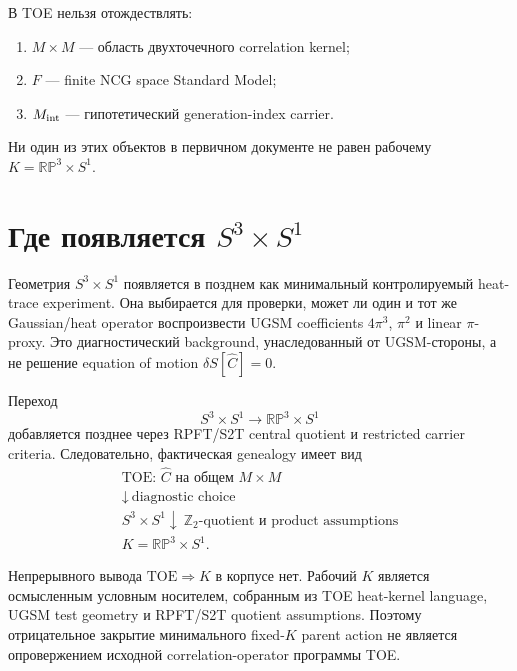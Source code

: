 \begin{proposition}
В TOE нельзя отождествлять:
\begin{enumerate}
 \item \(M\times M\) --- область двухточечного correlation kernel;
 \item \(F\) --- finite NCG space Standard Model;
 \item \(M_{\rm int}\) --- гипотетический generation-index carrier.
\end{enumerate}
Ни один из этих объектов в первичном документе не равен рабочему
\(K=\mathbb{RP}^3\times S^1\).
\end{proposition}

\section{Где появляется \texorpdfstring{\(S^3\times S^1\)}{S3 x S1}}

Геометрия \(S^3\times S^1\) появляется в позднем
 как минимальный контролируемый
heat-trace experiment. Она выбирается для проверки, может ли один и тот же
Gaussian/heat operator воспроизвести UGSM coefficients \(4\pi^3\),
\(\pi^2\) и linear \(\pi\)-proxy. Это диагностический background,
унаследованный от UGSM-стороны, а не решение equation of motion
\(\delta S[\widehat C]=0\).

Переход
\begin{equation}
 S^3\times S^1
 \longrightarrow
 \mathbb{RP}^3\times S^1
\end{equation}
добавляется позднее через RPFT/S2T central quotient и restricted carrier
criteria. Следовательно, фактическая genealogy имеет вид
\begin{equation}
 \boxed{
 \begin{gathered}
 \text{TOE: }\widehat C\text{ на общем }M\times M
 \\
 \downarrow\ \text{diagnostic choice}
 \\
 S^3\times S^1
 \downarrow\ \mathbb Z_2\text{-quotient и product assumptions}
 \\
 K=\mathbb{RP}^3\times S^1.
 \end{gathered}}
\end{equation}

\begin{theorem}
Непрерывного вывода \(\text{TOE}\Rightarrow K\) в корпусе нет. Рабочий
\(K\) является осмысленным условным носителем, собранным из TOE heat-kernel
language, UGSM test geometry и RPFT/S2T quotient assumptions. Поэтому
отрицательное закрытие минимального fixed-\(K\) parent action не является
опровержением исходной correlation-operator программы TOE.
\end{theorem}

